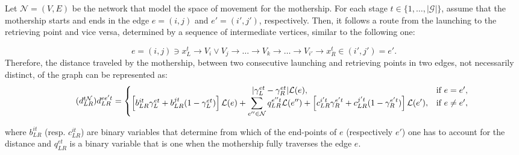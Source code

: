 Let $\mathcal N=(V, E)$ be the network that model the space of movement for the mothership. For each stage $t\in \{1,\ldots,|\mathcal G|\}$, assume that the mothership starts and ends in the edge $e=(i,j)$ and $e'=(i',j')$, respectively. Then, it follows a route from the launching to the retrieving point and vice versa, determined by a sequence of intermediate vertices, similar to the following one:

$$
e=(i, j) \ni x_L^t \rightarrow V_i \vee V_j \rightarrow \ldots \rightarrow V_k \rightarrow \ldots \rightarrow V_{i'} \rightarrow x_R^t \in (i',j')=e'.
$$
Therefore, the distance traveled by the mothership, between two consecutive launching and retrieving points in two edges, not necessarily distinct,  of the graph can be represented as:
\begin{equation}\tag{$d^{t\mathcal N}_{LR}$}\label{eq:dLRNt}
d_{LR}^{ee't} = \left\{\begin{matrix}
|\gamma_{L}^{et} - \gamma_{R}^{et}|\mathcal L(e), & \text{if } e = e',\\ 
\left[b_{LR}^{it}\gamma_{L}^{et} + b_{LR}^{jt}(1 - \gamma_{L}^{et})\right]\mathcal L(e) + \displaystyle \sum_{e''\in \mathcal N}q_{LR}^{e''t}\mathcal L(e'') + \left[c_{LR}^{i't}\gamma_{R}^{e't} + c_{LR}^{j't}(1 - \gamma_{R}^{e't})\right]\mathcal{L}(e'), & \text{if } e \neq e',
\end{matrix}\right.
\end{equation}

\noindent 
where $b_{LR}^{it}$ (resp. $c_{LR}^{it}$) are binary variables that determine from which of the end-points of $e$ (respectively $e'$) one has to account for the distance and $q_{LR}^{et}$ is a binary variable that is one when the mothership fully traverses the edge $e$. 

